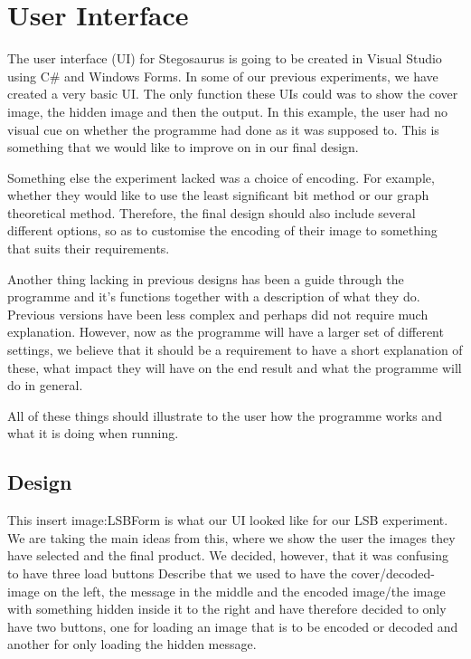 \section{User Interface}

The user interface (UI) for Stegosaurus is going to be created in Visual Studio using C\# and Windows Forms.
In some of our previous experiments, we have created a very basic UI. 
The only function these UIs could was to show the cover image, the hidden image and then the output.
In this example, the user had no visual cue on whether the programme had done as it was supposed to.
This is something that we would like to improve on in our final design.

Something else the experiment lacked was a choice of encoding. 
For example, whether they would like to use the least significant bit method or our graph theoretical method.
Therefore, the final design should also include several different options, so as to customise the encoding of their image to something that suits their requirements. 

Another thing lacking in previous designs has been a guide through the programme and it's functions together with a description of what they do.
Previous versions have been less complex and perhaps did not require much explanation. However, now as the programme will have a larger set of different settings, we believe that it should be a requirement to have a short explanation of these, what impact they will have on the end result and what the programme will do in general.

All of these things should illustrate to the user how the programme works and what it is doing when running.

\subsection{Design}

This {insert image:LSBForm} is what our UI looked like for our LSB experiment. We are taking the main ideas from this, where we show the user the images they have selected and the final product. We decided, however, that it was confusing to have three load buttons {Describe that we used to have the cover/decoded-image on the left, the message in the middle and the encoded image/the image with something hidden inside it to the right} and have therefore decided to only have two buttons, one for loading an image that is to be encoded or decoded and another for only loading the hidden message.

